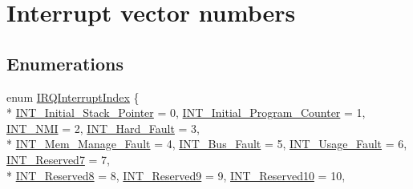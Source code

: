 \hypertarget{group___interrupt__vector__numbers}{}\section{Interrupt vector numbers}
\label{group___interrupt__vector__numbers}
\subsection*{Enumerations}
\begin{DoxyCompactItemize}
\item 
enum \hyperlink{group___interrupt__vector__numbers_ga5f3656e2a154b64aa378a2f3856c3a8d}{I\+R\+Q\+Interrupt\+Index} \{ \\*
\hyperlink{group___interrupt__vector__numbers_gga5f3656e2a154b64aa378a2f3856c3a8da92fc45ac2a27fa3b2da3494a629ae70d}{I\+N\+T\+\_\+\+Initial\+\_\+\+Stack\+\_\+\+Pointer} = 0, 
\hyperlink{group___interrupt__vector__numbers_gga5f3656e2a154b64aa378a2f3856c3a8da7171e28892d2c1f7d1bca288bf743d7f}{I\+N\+T\+\_\+\+Initial\+\_\+\+Program\+\_\+\+Counter} = 1, 
\hyperlink{group___interrupt__vector__numbers_gga5f3656e2a154b64aa378a2f3856c3a8da4e1635ebba2c23b8f6fde7521164ef08}{I\+N\+T\+\_\+\+N\+M\+I} = 2, 
\hyperlink{group___interrupt__vector__numbers_gga5f3656e2a154b64aa378a2f3856c3a8da18ac0316e85bb517d51e7008ba782354}{I\+N\+T\+\_\+\+Hard\+\_\+\+Fault} = 3, 
\\*
\hyperlink{group___interrupt__vector__numbers_gga5f3656e2a154b64aa378a2f3856c3a8da31162f6d7e4a5315ebf60004e4f32ac5}{I\+N\+T\+\_\+\+Mem\+\_\+\+Manage\+\_\+\+Fault} = 4, 
\hyperlink{group___interrupt__vector__numbers_gga5f3656e2a154b64aa378a2f3856c3a8da660325666cf3ee1715e40e6f58043d38}{I\+N\+T\+\_\+\+Bus\+\_\+\+Fault} = 5, 
\hyperlink{group___interrupt__vector__numbers_gga5f3656e2a154b64aa378a2f3856c3a8da0d9a9fe9cc8ea8d5831cb1c1e11b88a8}{I\+N\+T\+\_\+\+Usage\+\_\+\+Fault} = 6, 
\hyperlink{group___interrupt__vector__numbers_gga5f3656e2a154b64aa378a2f3856c3a8da82712c8d6787e5bcb52fcf624b37f3af}{I\+N\+T\+\_\+\+Reserved7} = 7, 
\\*
\hyperlink{group___interrupt__vector__numbers_gga5f3656e2a154b64aa378a2f3856c3a8dabdb61b834090bb5d66b2c4b2cae20afd}{I\+N\+T\+\_\+\+Reserved8} = 8, 
\hyperlink{group___interrupt__vector__numbers_gga5f3656e2a154b64aa378a2f3856c3a8da3ed02973df7310e008e8f440637ce6e4}{I\+N\+T\+\_\+\+Reserved9} = 9, 
\hyperlink{group___interrupt__vector__numbers_gga5f3656e2a154b64aa378a2f3856c3a8daef05953f9dc13f3f824aa27cf401b23a}{I\+N\+T\+\_\+\+Reserved10} = 10, 

\end{DoxyCompactItemize}
